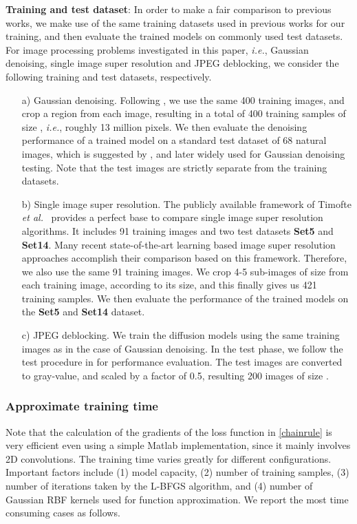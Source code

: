 \documentclass[10pt,journal,compsoc]{IEEEtran}
\newcommand{\etal}{\emph{et al.}}
\newcommand{\ie}{\emph{i.e.}}
\begin{document}
\noindent \textbf{Training and test dataset}: 
In order to make a fair comparison to previous works, we make use of the same training datasets used in previous works for 
our training, and then evaluate the trained models on commonly used test datasets. For image processing problems 
investigated in this paper, \ie, Gaussian denoising, single image super resolution and JPEG deblocking, we consider the following 
training and test datasets, respectively. 
\begin{itemize}[leftmargin=*]
\setlength\itemsep{0em}
    \item[a)] \noindent Gaussian denoising. Following \cite{CSF2014}, we use the same 400 training images, 
and crop a  region from each image, resulting in a total of 400 training samples 
of size , \ie, roughly 13 million pixels. We then evaluate the denoising performance of a trained model 
on a standard test dataset of 68 natural images, which is suggested by \cite{RothFOE2009}, and later widely used for Gaussian 
denoising testing. Note that the test images are 
strictly separate from the training datasets. 
    \item[b)] Single image super resolution. 
The publicly available framework of Timofte \etal ~\cite{ANR} provides a perfect base to 
compare single image super resolution algorithms. It includes 91 training images and two test datasets \textbf{Set5} and 
\textbf{Set14}. Many recent state-of-the-art learning based image super resolution approaches \cite{schulter15, SRCNN} 
accomplish their comparison 
based on this framework. Therefore, we also use the same 91 training images. We crop 4-5 
sub-images of size  from each training image, according to its size, and this finally gives us 421 training samples. 
We then evaluate the performance of the trained models on the \textbf{Set5} and \textbf{Set14} dataset. 
    \item[c)] JPEG deblocking. We train the diffusion models using the same training images as in the case of Gaussian denoising. 
In the test phase, we follow the test procedure in \cite{ECCV2012RTF} for performance evaluation. 
The test images are converted to gray-value, and scaled by a factor of 0.5, resulting 200 images of size . 
\end{itemize}

\subsubsection{Approximate training time}
Note that the calculation of the gradients of the loss function in \eqref{chainrule} 
is very efficient even using 
a simple Matlab implementation, 
since it mainly involves 2D convolutions. The training time 
varies greatly for different configurations. Important factors include (1) model capacity, (2) number of training samples, 
(3) number of iterations taken by the L-BFGS algorithm, 
and (4) number of Gaussian RBF kernels used for function approximation. 
We report the most time consuming cases as follows. 
\end{document}
